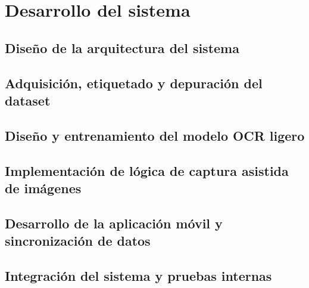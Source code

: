 \chapter{Desarrollo del sistema}
\label{chap:system_development}

\section{Diseño de la arquitectura del sistema}
\label{sec:architecture_design}

\section{Adquisición, etiquetado y depuración del dataset}
\label{sec:dataset_acquisition}

\section{Diseño y entrenamiento del modelo OCR ligero}
\label{sec:ocr_model_design}

\section{Implementación de lógica de captura asistida de imágenes}
\label{sec:assisted_capture}

\section{Desarrollo de la aplicación móvil y sincronización de datos}
\label{sec:mobile_app_development}

\section{Integración del sistema y pruebas internas}
\label{sec:integration_testing}
